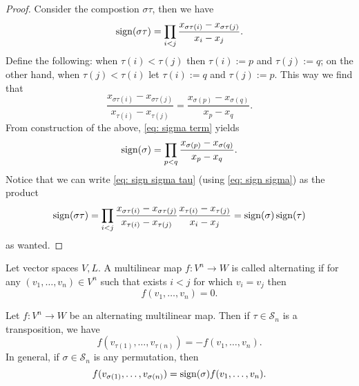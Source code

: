 \begin{proof}
  Consider the compostion \(\sigma \tau\), then we have
  \begin{equation}\label{eq: sign sigma tau}
     \operatorname{sign}(\sigma \tau) = \prod_{i < j} \frac{x_{\sigma\tau(i)} -
     x_{\sigma\tau(j)}}{x_i - x_j}.
  \end{equation}
  Define the following: when \(\tau(i) < \tau(j)\) then \(\tau(i) := p\) and
  \(\tau(j) := q\); on the other hand, when \(\tau(j) < \tau(i)\) let \(\tau(i)
  := q\) and \(\tau(j) := p\). This way we find that
  \begin{equation}\label{eq: sigma term}
    \frac{x_{\sigma\tau(i)} - x_{\sigma\tau(j)}}{x_{\tau(i)} - x_{\tau(j)}}
    = \frac{x_{\sigma(p)} - x_{\sigma(q)}}{x_p - x_q}.
  \end{equation}
  From construction of the above, \cref{eq: sigma term} yields
  \begin{equation}\label{eq: sign sigma}
    \operatorname{sign}(\sigma) = \prod_{p < q} \frac{x_{\sigma(p)} -
    x_{\sigma(q)}}{x_p - x_q}.
  \end{equation}
  Notice that we can write \cref{eq: sign sigma tau} (using \cref{eq: sign
  sigma}) as the product
  \[
    \operatorname{sign}(\sigma \tau) = \prod_{i < j}
    \frac{x_{\sigma \tau(i)} - x_{\sigma \tau(j)}}{x_{\tau(i)} - x_{\tau(j)}}
    \frac{x_{\tau(i)} - x_{\tau(j)}}{x_i - x_j}
    = \operatorname{sign}(\sigma) \operatorname{sign}(\tau)
  \]
  as wanted.
\end{proof}

\begin{definition}
  \label{def: alternating map}
  Let vector spaces \(V, L\). A multilinear map \(f: V^n \to W\) is called
  alternating if for any \((v_1, \dots, v_n) \in V^n\) such
  that exists \(i < j\) for which \(v_i = v_j\) then
  \[
    f(v_1, \dots, v_n) = 0.
  \]
\end{definition}

\begin{proposition}\label{prop: alternating map property}
  Let \(f: V^n \to W\) be an alternating multilinear map. Then if \(\tau \in
  \mathcal S_n\) is a transposition, we have
  \[
    f(v_{\tau(1)}, \dots, v_{\tau(n)}) = - f(v_1, \dots, v_n).
  \]
  In general, if \(\sigma \in \mathcal S_n\) is any permutation, then
  \[
    f(v_{\sigma(1)}, \dots, v_{\sigma(n)}) = \operatorname{sign}(\sigma) f(v_1,
    \dots, v_n).
  \]
\end{proposition}

